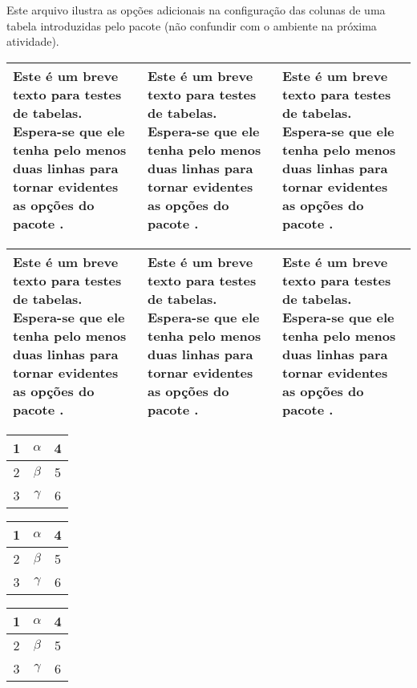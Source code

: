 \documentclass[a4paper,12pt]{article}
\newcommand\textobreve
		{\tiny Este é um breve texto para testes de tabelas.
		Espera-se que ele tenha pelo menos duas linhas para
		tornar evidentes as opções do pacote \pacote{array}.}
\begin{document}
	
	Este arquivo ilustra as opções adicionais na configuração das colunas de uma tabela introduzidas pelo pacote  (não confundir com o ambiente  na próxima atividade).
	
	\linhabase\hfill
	\begin{tabular}[c]{|p{35mm}|m{35mm}|b{35mm}|}
		\hline
		\textobreve & \textobreve & \textobreve \\
		\hline
	\end{tabular}%
	\hfill\null

	\linhabase\hfill
	\begin{tabular}[c]{|>{\raggedright}p{35mm}|>{\centering}m{35mm}|>{\raggedleft}b{35mm}|}
		\hline
		\textobreve & \textobreve  & \textobreve \tabularnewline
		\hline
	\end{tabular}%
	\hfill\null
	
	\linhabase\hfill
	\begin{tabular}[c]{|c|>{$}c<{$}|c|}
		\hline
		1 & \alpha & 4 \tabularnewline
		\hline
		2 & \beta  & 5 \tabularnewline
		\hline
		3 & \gamma & 6 \tabularnewline
		\hline
	\end{tabular}%
	\hfill\null
	
	\linhabase\hfill
	\begin{tabular}[c]{|c!{$+$}>{$}c<{$}|c|}
		\hline
		1 & \alpha & 4 \tabularnewline
		\hline
		2 & \beta  & 5 \tabularnewline
		\hline
		3 & \gamma & 6 \tabularnewline
		\hline
	\end{tabular}%
	\hfill
	\begin{tabular}[c]{|c@{$+$}>{$}c<{$}|c|}
		\hline
		1 & \alpha & 4 \tabularnewline
		\hline
		2 & \beta  & 5 \tabularnewline
		\hline
		3 & \gamma & 6 \tabularnewline
		\hline
	\end{tabular}%
	\hfill\null
	
\end{document}
